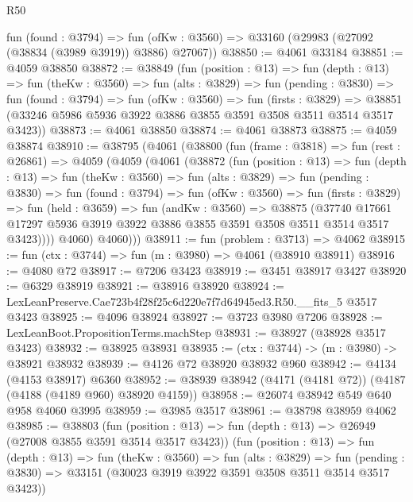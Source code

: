 \begin{lexlean}{R50}
\begin{coremodule}
    fun (found : @3794) =>
    fun (ofKw : @3560) => @33160 (@29983 (@27092 (@38834 (@3989 @3919)) @3886) @27067))
@38850 := @4061 @33184
@38851 := @4059 @38850
@38872 := @38849
    (fun (position : @13) =>
    fun (depth : @13) =>
    fun (theKw : @3560) =>
    fun (alts : @3829) =>
    fun (pending : @3830) =>
    fun (found : @3794) =>
    fun (ofKw : @3560) =>
    fun (firsts : @3829) =>
    @38851 (@33246 @5986 @5936 @3922 @3886 @3855 @3591 @3508 @3511 @3514 @3517 @3423))
@38873 := @4061 @38850
@38874 := @4061 @38873
@38875 := @4059 @38874
@38910 := @38795
    (@4061
      (@38800
        (fun (frame : @3818) =>
        fun (rest : @26861) =>
        @4059
          (@4059
            (@4061
              (@38872
                (fun (position : @13) =>
                fun (depth : @13) =>
                fun (theKw : @3560) =>
                fun (alts : @3829) =>
                fun (pending : @3830) =>
                fun (found : @3794) =>
                fun (ofKw : @3560) =>
                fun (firsts : @3829) =>
                fun (held : @3659) =>
                fun (andKw : @3560) =>
                @38875
                  (@37740
                    @17661
                    @17297
                    @5936
                    @3919
                    @3922
                    @3886
                    @3855
                    @3591
                    @3508
                    @3511
                    @3514
                    @3517
                    @3423))))
            @4060)
          @4060)))
@38911 := fun (problem : @3713) => @4062
@38915 := fun (ctx : @3744) => fun (m : @3980) => @4061 (@38910 @38911)
@38916 := @4080 @72
@38917 := @7206 @3423
@38919 := @3451 @38917 @3427
@38920 := @6329 @38919
@38921 := @38916 @38920
@38924 := LexLeanPreserve.Cae723b4f28f25c6d220e7f7d64945ed3.R50.__fits_5 @3517 @3423
@38925 := @4096 @38924
@38927 := @3723 @3980 @7206
@38928 := LexLeanBoot.PropositionTerms.machStep
@38931 := @38927 (@38928 @3517 @3423)
@38932 := @38925 @38931
@38935 := (ctx : @3744) -> (m : @3980) -> @38921 @38932
@38939 := @4126 @72 @38920 @38932 @960
@38942 := @4134 (@4153 @38917) @6360
@38952 := @38939 @38942 (@4171 (@4181 @72)) (@4187 (@4188 (@4189 @960) @38920 @4159))
@38958 := @26074 @38942 @549 @640 @958 @4060 @3995
@38959 := @3985 @3517
@38961 := @38798 @38959 @4062
@38985 := @38803
    (fun (position : @13) => fun (depth : @13) => @26949 (@27008 @3855 @3591 @3514 @3517 @3423))
    (fun (position : @13) =>
    fun (depth : @13) =>
    fun (theKw : @3560) =>
    fun (alts : @3829) =>
    fun (pending : @3830) => @33151 (@30023 @3919 @3922 @3591 @3508 @3511 @3514 @3517 @3423))

\end{coremodule}
\end{lexlean}
